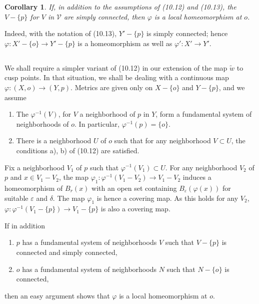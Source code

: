\documentclass[12pt,a4paper]{article}
\theoremstyle{plain}
\newtheorem{corollary}[theorem]{Corollary}
\theoremstyle{definition}
\theoremstyle{remark}
\begin{document}
\begin{corollary}
\label{10.13.3}
If, in addition to the assumptions of (10.12) and (10.13), the $V - \{p\}$ for $V$ in $\mathscr{V}$ are simply connected, then $\varphi$ is a local homeomorphism at $o$.
\end{corollary}

Indeed, with the notation of (10.13), $Y' - \{p\}$ is simply connected; hence $\varphi : X' - \{o\} \to Y' - \{p\}$ is a homeomorphism as well as $\varphi' : X' \to Y'$.

\subsection{}
\label{10.14}

We shall require a simpler variant of (10.12) in our extension of the map $\widetilde{w}$ to cusp points. In that situation, we shall be dealing with a continuous map $\varphi : (X, o) \to (Y, p)$. Metrics are given only on $X - \{o\}$ and $Y - \{p\}$, and we assume
\begin{enumerate}
\item[a)] The $\varphi^{-1}(V)$, for $V$ a neighborhood of $p$ in $Y$, form a fundamental system of neighborhoods of $o$. In particular, $\varphi^{-1}(p) = \{o\}$.
\item[b)] There is a neighborhood $U$ of $o$ such that for any neighborhood $V \subset U$, the conditions a), b) of (10.12) are satisfied.
\end{enumerate}

Fix a neighborhood $V_1$ of $p$ such that $\varphi^{-1}(V_1) \subset U$. For any neighborhood $V_2$ of $p$ and $x \in V_1 - V_2$, the map $\varphi_1 : \varphi^{-1}(V_1 - V_2) \to V_1 - V_2$ induces a homeomorphism of $B_r(x)$ with an open set containing $B_\varepsilon(\varphi(x))$ for suitable $\varepsilon$ and $\delta$. The map $\varphi_1$ is hence a covering map. As this holds for any $V_2$, $\varphi : \varphi^{-1}(V_1 - \{p\}) \to V_1 - \{p\}$ is also a covering map.

If in addition
\begin{enumerate}
\item[c)] $p$ has a fundamental system of neighborhoods $V$ such that $V - \{p\}$ is connected and simply connected,
\item[d)] $o$ has a fundamental system of neighborhoods $N$ such that $N - \{o\}$ is connected,
\end{enumerate}
then an easy argument shows that $\varphi$ is a local homeomorphism at $o$.
\end{document}
